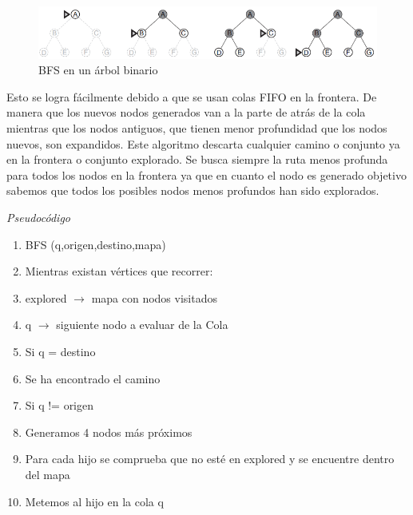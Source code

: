\documentclass[conference]{IEEEtran}
\begin{document}
\begin{figure}[H]
\centerline{\includegraphics[scale=0.4]{IMAGENES/BFS.png}}
\caption{BFS en un \'arbol binario}
\label{fig}
\end{figure}

Esto se logra f\'acilmente debido a que se usan colas FIFO en la frontera. De manera que los nuevos nodos generados van a la parte de atr\'as de la cola mientras que los nodos antiguos, que tienen menor profundidad que los nodos nuevos, son expandidos. Este algoritmo descarta cualquier camino o conjunto ya en la frontera o conjunto explorado. Se busca siempre la ruta menos profunda para todos los nodos en la frontera ya que en cuanto el nodo es generado objetivo sabemos que todos los posibles nodos menos profundos han sido explorados.

\begin{center}
\textit{Pseudocódigo}
\end{center}

\begin{enumerate}
\item BFS (q,origen,destino,mapa)
\item \hspace{1cm} Mientras existan v\'ertices que recorrer:
\item \hspace{1cm} explored \(\rightarrow\) mapa con nodos visitados
\item \hspace{1cm} q $\rightarrow$ siguiente nodo a evaluar de la Cola
\item \hspace{1cm} Si q = destino
\item \hspace{2cm} Se ha encontrado el camino
\item \hspace{1cm} Si q != origen
\item \hspace{2cm} Generamos 4 nodos m\'as pr\'oximos
\item \hspace{1cm} Para cada hijo se comprueba que no est\'e en explored  y se encuentre dentro del mapa
\item \hspace{1cm} Metemos al hijo en la cola q
\end{enumerate}
\end{document}
